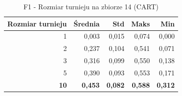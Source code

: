 \begin{table}[htbp]
\centering
\small
\setlength{\tabcolsep}{6pt}
\renewcommand{\arraystretch}{1.2}
\caption{F1 - Rozmiar turnieju na zbiorze 14 (CART)}
\label{tab:CART_tournament_size_14_f1}
\begin{tabular}{r|r|r|r|r}
\toprule
Rozmiar turnieju & Średnia & Std & Maks & Min \\
\hline
1 & 0,003 & 0,015 & 0,074 & 0,000 \\
2 & 0,237 & 0,104 & 0,541 & 0,071 \\
3 & 0,316 & 0,099 & 0,550 & 0,138 \\
5 & 0,390 & 0,093 & 0,553 & 0,171 \\
\textbf{10} & \textbf{0,453} & \textbf{0,082} & \textbf{0,588} & \textbf{0,312} \\
\bottomrule
\end{tabular}
\end{table}